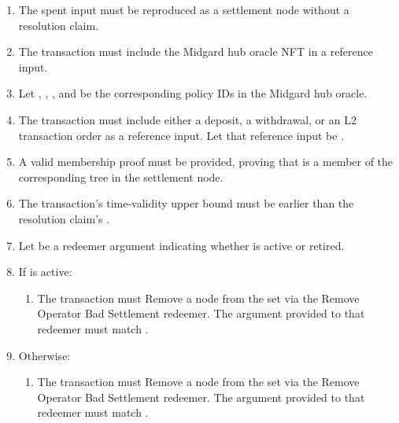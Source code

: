 \documentclass[../midgard.tex]{subfiles}
\begin{document}
\begin{description}
\begin{enumerate}
        \item The spent input must be reproduced as a settlement node without a resolution claim.
        \item The transaction must include the Midgard hub oracle NFT in a reference input.
        \item Let , , , and  be the corresponding policy IDs in the Midgard hub oracle.
        \item The transaction must include either a deposit, a withdrawal, or an L2 transaction order as a reference input.
          Let that reference input be .
        \item A valid membership proof must be provided, proving that  is a member of the corresponding tree in the settlement node.
        \item The transaction's time-validity upper bound must be earlier than the resolution claim's .
        \item Let  be a redeemer argument indicating whether  is active or retired.
        \item If  is active:
            \begin{enumerate}
                \item The transaction must Remove a node from the  set via the Remove Operator Bad Settlement redeemer.
                  The  argument provided to that redeemer must match .
            \end{enumerate}
        \item Otherwise:
            \begin{enumerate}
                \item The transaction must Remove a node from the  set via the Remove Operator Bad Settlement redeemer.
                  The  argument provided to that redeemer must match .
            \end{enumerate}
      \end{enumerate}
\end{description}
\end{document}
